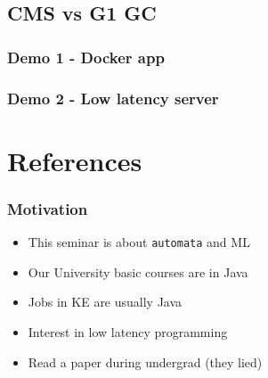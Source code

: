 \documentclass{beamer}
\begin{document}
    \subsection{CMS vs G1 GC}
    \subsubsection{Demo 1 - Docker app}
    \subsubsection{Demo 2 - Low latency server}


\section*{References}

\begin{frame}
    \frametitle{Motivation}
    \begin{itemize}
        \item This seminar is about \texttt{automata} and ML 
        \item Our University basic courses are in Java 
        \item Jobs in KE are usually Java
        \item Interest in low latency programming
        \item Read a paper during undergrad (they lied)
    \end{itemize}
\end{frame}
\end{document}
